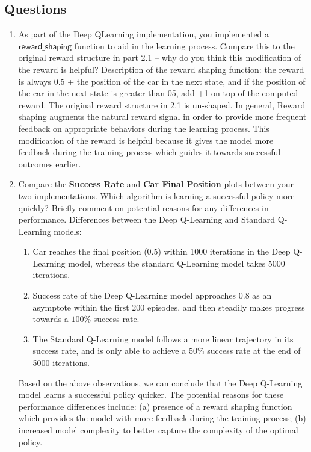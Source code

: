 \subsection{Questions}
\begin{enumerate}
    \item As part of the Deep QLearning implementation, you implemented a $\mathsf{reward\_shaping}$ function to aid in the learning process. Compare this to the original reward structure in part 2.1 -- why do you think this modification of the reward is helpful?
    \newline
	Description of the reward shaping function: the reward is always 0.5 + the position of the car in the next state, and if the position of the car in the next state is greater than 05, add +1 on top of the computed reward. The original reward structure in 2.1 is un-shaped.
	\newline
	\newline
	In general, Reward shaping augments the natural reward signal in order to provide more frequent feedback on appropriate behaviors during the learning process. This modification of the reward is helpful because it gives the model more feedback during the training process which guides it towards successful outcomes earlier.

    \item Compare the \textbf{Success Rate} and \textbf{Car Final Position} plots between your two implementations. Which algorithm is learning a successful policy more quickly? Briefly comment on potential reasons for any differences in performance.
    \newline\newline
    Differences between the Deep Q-Learning and Standard Q-Learning models: 
    \begin{enumerate}
    \item Car reaches the final position (0.5) within 1000 iterations in the Deep Q-Learning model, whereas the standard Q-Learning model takes 5000 iterations.
    \item Success rate of the Deep Q-Learning model approaches 0.8 as an asymptote within the first 200 episodes, and then steadily makes progress towards a $100\%$ success rate.
    \item The Standard Q-Learning model follows a more linear trajectory in its success rate, and is only able to achieve a $50\%$ success rate at the end of 5000 iterations.
    \end{enumerate}
    
    Based on the above observations, we can conclude that the Deep Q-Learning model learns a successful policy quicker. The potential reasons for these performance differences include: (a) presence of a reward shaping function which provides the model with more feedback during the training process; (b) increased model complexity to better capture the complexity of the optimal policy.
    
\end{enumerate}
